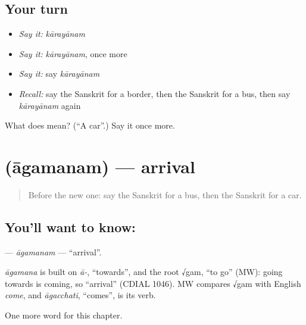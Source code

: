 \subsection*{Your turn}
\begin{itemize}
\raggedright
  \item \emph{Say it:} \emph{kārayānam}
  \item \emph{Say it:} \emph{kārayānam}, once more
  \item \emph{Say it:} say \emph{kārayānam}
  \item \emph{Recall:} say the Sanskrit for a border, then the Sanskrit for a bus, then say \emph{kārayānam} again
\end{itemize}

\begin{tcolorbox}[breakable,colback=teal!4,colframe=teal!35!black,title={Before you move on}]
What does  mean? (\textquotedblleft{}A car\textquotedblright{}.) Say it once more.
\end{tcolorbox}
\section[\texorpdfstring{\sk{आगमनम्} (āgamanam)}{आगमनम् (āgamanam)}]{ (āgamanam) — arrival}

\label{lesson:SA-C257-agamanam}



\begin{quote}
Before the new one: say the Sanskrit for a bus, then the Sanskrit for a car.
\end{quote}

\subsection*{You'll want to know: }
\textbf{} — \emph{āgamanam} — \textquotedblleft{}arrival\textquotedblright{}.

\begin{cousinweb}
\emph{āgamana} is built on \emph{ā-}, \textquotedblleft{}towards\textquotedblright{}, and the root √gam, \textquotedblleft{}to go\textquotedblright{} (MW): going towards is coming, so \textquotedblleft{}arrival\textquotedblright{} (CDIAL 1046). MW compares √gam with English \emph{come}, and \emph{āgacchati}, \textquotedblleft{}comes\textquotedblright{}, is its verb.
\end{cousinweb}

\begin{grammarlens}[title={What you've built}]
One more word for this chapter.
\end{grammarlens}

